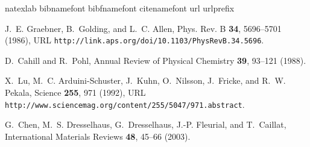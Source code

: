 \documentclass[12pt,twocolumn,iop]{/usr/share/texmf/tex/latex/iop/iopart}[/usr/share/texmf/tex/latex/iop/]
\begin{document}
\begin{thebibliography}{90}
\expandafter\ifx\csname natexlab\endcsname\relax\def\natexlab#1{#1}\fi
\expandafter\ifx\csname bibnamefont\endcsname\relax
  \def\bibnamefont#1{#1}\fi
\expandafter\ifx\csname bibfnamefont\endcsname\relax
  \def\bibfnamefont#1{#1}\fi
\expandafter\ifx\csname citenamefont\endcsname\relax
  \def\citenamefont#1{#1}\fi
\expandafter\ifx\csname url\endcsname\relax
  \def\url#1{\texttt{#1}}\fi
\expandafter\ifx\csname urlprefix\endcsname\relax\def\urlprefix{URL }\fi
\providecommand{\bibinfo}[2]{#2}
\providecommand{\eprint}[2][]{\url{#2}}

\bibinfo{author}{\bibfnamefont{J.~E.} \bibnamefont{Graebner}},
  \bibinfo{author}{\bibfnamefont{B.}~\bibnamefont{Golding}}, \bibnamefont{and}
  \bibinfo{author}{\bibfnamefont{L.~C.} \bibnamefont{Allen}},
  \bibinfo{journal}{Phys. Rev. B} \textbf{\bibinfo{volume}{34}},
  \bibinfo{pages}{5696–5701} (\bibinfo{year}{1986}),
  \urlprefix\url{http://link.aps.org/doi/10.1103/PhysRevB.34.5696}.

\bibinfo{author}{\bibfnamefont{D.}~\bibnamefont{Cahill}} \bibnamefont{and}
  \bibinfo{author}{\bibfnamefont{R.}~\bibnamefont{Pohl}},
  \bibinfo{journal}{Annual Review of Physical Chemistry}
  \textbf{\bibinfo{volume}{39}}, \bibinfo{pages}{93–121}
  (\bibinfo{year}{1988}).

\bibinfo{author}{\bibfnamefont{X.}~\bibnamefont{Lu}},
  \bibinfo{author}{\bibfnamefont{M.~C.} \bibnamefont{Arduini-Schuster}},
  \bibinfo{author}{\bibfnamefont{J.}~\bibnamefont{Kuhn}},
  \bibinfo{author}{\bibfnamefont{O.}~\bibnamefont{Nilsson}},
  \bibinfo{author}{\bibfnamefont{J.}~\bibnamefont{Fricke}}, \bibnamefont{and}
  \bibinfo{author}{\bibfnamefont{R.~W.} \bibnamefont{Pekala}},
  \bibinfo{journal}{Science} \textbf{\bibinfo{volume}{255}},
  \bibinfo{pages}{971} (\bibinfo{year}{1992}),
  \urlprefix\url{http://www.sciencemag.org/content/255/5047/971.abstract}.

\bibinfo{author}{\bibfnamefont{G.}~\bibnamefont{Chen}},
  \bibinfo{author}{\bibfnamefont{M.~S.} \bibnamefont{Dresselhaus}},
  \bibinfo{author}{\bibfnamefont{G.}~\bibnamefont{Dresselhaus}},
  \bibinfo{author}{\bibfnamefont{J.-P.} \bibnamefont{Fleurial}},
  \bibnamefont{and} \bibinfo{author}{\bibfnamefont{T.}~\bibnamefont{Caillat}},
  \bibinfo{journal}{International Materials Reviews}
  \textbf{\bibinfo{volume}{48}}, \bibinfo{pages}{45–66}
  (\bibinfo{year}{2003}).


\end{thebibliography}
\end{document}
